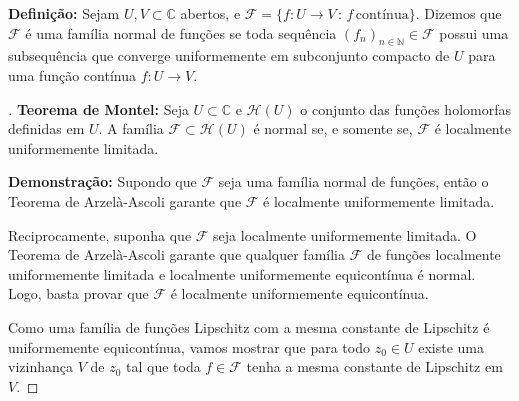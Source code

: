 \textbf{Definição: }Sejam $U,V\subset\mathbb{C}$ abertos, e $\mathcal{F} = \{f\colon U\longrightarrow V\,:\, f\,\textrm{contínua}\}$. Dizemos que $\mathcal{F}$ é uma família normal de funções se toda sequência $(f_n)_{n\in\mathbb{N}}\in\mathcal{F}$ possui uma subsequência que converge uniformemente em subconjunto compacto de $U$ para uma função contínua $f\colon U\longrightarrow V$.

\begin{proof}[]
\textbf{Teorema de Montel: }Seja $U\subset\mathbb{C}$ e $\mathcal{H}(U)$ o conjunto das funções holomorfas definidas em $U$. A família $\mathcal{F}\subset\mathcal{H}(U)$ é normal se, e somente se, $\mathcal{F}$ é localmente uniformemente limitada.

\textbf{Demonstração: } Supondo que $\mathcal{F}$ seja uma família normal de funções, então o Teorema de Arzelà-Ascoli garante que $\mathcal{F}$ é localmente uniformemente limitada.

Reciprocamente, suponha que $\mathcal{F}$ seja localmente uniformemente limitada. O Teorema de Arzelà-Ascoli garante que qualquer família $\mathcal{F}$ de funções localmente uniformemente limitada e localmente uniformemente equicontínua é normal. Logo, basta provar que $\mathcal{F}$ é localmente uniformemente equicontínua.

Como uma família de funções Lipschitz com a mesma constante de Lipschitz é uniformemente equicontínua, vamos mostrar que para todo $z_0\in U$ existe uma vizinhança $V$ de $z_0$ tal que toda $f\in\mathcal{F}$ tenha a mesma constante de Lipschitz em $V$. 


\end{proof}
